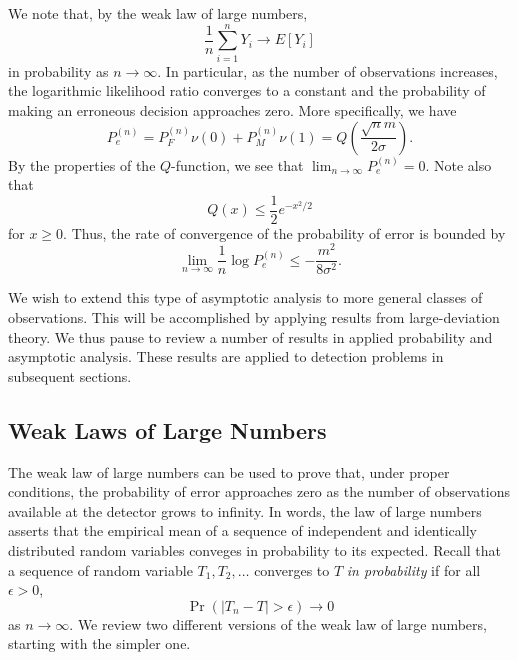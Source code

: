 We note that, by the weak law of large numbers,
\begin{equation*}
\frac{1}{n} \sum_{i=1}^n Y_i \rightarrow E[Y_i]
\end{equation*}
in probability as $n \rightarrow \infty$.
In particular, as the number of observations increases, the logarithmic likelihood ratio converges to a constant and the probability of making an erroneous decision approaches zero.
More specifically, we have
\begin{equation*}
P_e^{(n)} = P_F^{(n)} \nu(0) + P_M^{(n)} \nu(1)
= Q \left( \frac{\sqrt{n} m}{2 \sigma} \right) .
\end{equation*}
By the properties of the $Q$-function, we see that $\lim_{n \rightarrow \infty} P_e^{(n)} = 0$.
Note also that
\begin{equation*}
Q(x) \leq  \frac{1}{2} e^{-x^2/2}
\end{equation*}
for $x \geq 0$.
Thus, the rate of convergence of the probability of error is bounded by
\begin{equation*}
\lim_{n \rightarrow \infty} \frac{1}{n} \log P_e^{(n)}
\leq - \frac{m^2}{8 \sigma^2} .
\end{equation*}

We wish to extend this type of asymptotic analysis to more general classes of observations.
This will be accomplished by applying results from large-deviation theory.
We thus pause to review a number of results in applied probability and asymptotic analysis.
These results are applied to detection problems in subsequent sections.


\subsection{Weak Laws of Large Numbers}

The weak law of large numbers can be used to prove that, under proper conditions, the probability of error approaches zero as the number of observations available at the detector grows to infinity.
In words, the law of large numbers asserts that the empirical mean of a sequence of independent and identically distributed random variables conveges in probability to its expected.
Recall that a sequence of random variable $T_1, T_2, \ldots$ converges to $T$ \emph{in probability} if for all $\epsilon > 0$,
\begin{equation*}
\Pr(|T_n - T| > \epsilon) \rightarrow 0
\end{equation*}
as $n \rightarrow \infty$.
We review two different versions of the weak law of large numbers, starting with the simpler one.


